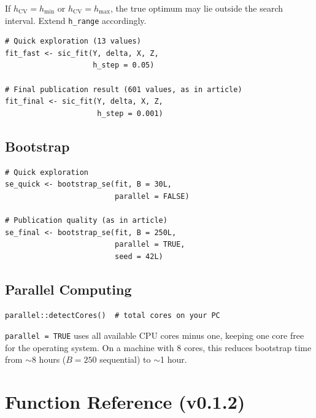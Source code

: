 \documentclass[12pt,a4paper]{article}
\begin{document}
\begin{warningbox}
If $h_{\mathrm{CV}} = h_{\min}$ or $h_{\mathrm{CV}} = h_{\max}$,
the true optimum may lie outside the search interval. Extend
\texttt{h\_range} accordingly.
\end{warningbox}

\begin{lstlisting}[style=Rcode,
  caption={Bandwidth tuning}]
# Quick exploration (13 values)
fit_fast <- sic_fit(Y, delta, X, Z,
                    h_step = 0.05)

# Final publication result (601 values, as in article)
fit_final <- sic_fit(Y, delta, X, Z,
                     h_step = 0.001)
\end{lstlisting}

\subsection{Bootstrap}

\begin{lstlisting}[style=Rcode,
  caption={Bootstrap recommendations}]
# Quick exploration
se_quick <- bootstrap_se(fit, B = 30L,
                         parallel = FALSE)

# Publication quality (as in article)
se_final <- bootstrap_se(fit, B = 250L,
                         parallel = TRUE,
                         seed = 42L)
\end{lstlisting}

\subsection{Parallel Computing}

\begin{lstlisting}[style=Rcode,
  caption={Check available CPU cores}]
parallel::detectCores()  # total cores on your PC
\end{lstlisting}

\begin{infobox}
\texttt{parallel = TRUE} uses all available CPU cores minus one,
keeping one core free for the operating system. On a machine
with 8 cores, this reduces bootstrap time from $\sim$8 hours
($B=250$ sequential) to $\sim$1 hour.
\end{infobox}

\section{Function Reference (v0.1.2)}
\end{document}
